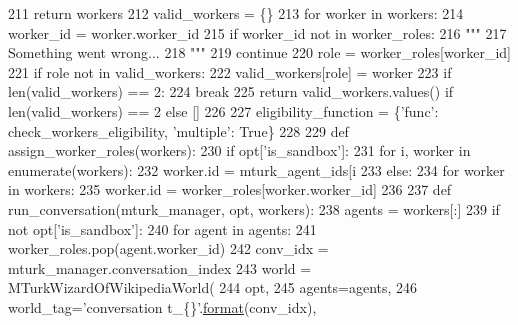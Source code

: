 \begin{DoxyCode}
211                 \textcolor{keywordflow}{return} workers
212             valid\_workers = \{\}
213             \textcolor{keywordflow}{for} worker \textcolor{keywordflow}{in} workers:
214                 worker\_id = worker.worker\_id
215                 \textcolor{keywordflow}{if} worker\_id \textcolor{keywordflow}{not} \textcolor{keywordflow}{in} worker\_roles:
216                     \textcolor{stringliteral}{"""}
217 \textcolor{stringliteral}{                    Something went wrong...}
218 \textcolor{stringliteral}{                    """}
219                     \textcolor{keywordflow}{continue}
220                 role = worker\_roles[worker\_id]
221                 \textcolor{keywordflow}{if} role \textcolor{keywordflow}{not} \textcolor{keywordflow}{in} valid\_workers:
222                     valid\_workers[role] = worker
223                 \textcolor{keywordflow}{if} len(valid\_workers) == 2:
224                     \textcolor{keywordflow}{break}
225             \textcolor{keywordflow}{return} valid\_workers.values() \textcolor{keywordflow}{if} len(valid\_workers) == 2 \textcolor{keywordflow}{else} []
226 
227         eligibility\_function = \{\textcolor{stringliteral}{'func'}: check\_workers\_eligibility, \textcolor{stringliteral}{'multiple'}: \textcolor{keyword}{True}\}
228 
229         \textcolor{keyword}{def }assign\_worker\_roles(workers):
230             \textcolor{keywordflow}{if} opt[\textcolor{stringliteral}{'is\_sandbox'}]:
231                 \textcolor{keywordflow}{for} i, worker \textcolor{keywordflow}{in} enumerate(workers):
232                     worker.id = mturk\_agent\_ids[i %
233             \textcolor{keywordflow}{else}:
234                 \textcolor{keywordflow}{for} worker \textcolor{keywordflow}{in} workers:
235                     worker.id = worker\_roles[worker.worker\_id]
236 
237         \textcolor{keyword}{def }run\_conversation(mturk\_manager, opt, workers):
238             agents = workers[:]
239             \textcolor{keywordflow}{if} \textcolor{keywordflow}{not} opt[\textcolor{stringliteral}{'is\_sandbox'}]:
240                 \textcolor{keywordflow}{for} agent \textcolor{keywordflow}{in} agents:
241                     worker\_roles.pop(agent.worker\_id)
242             conv\_idx = mturk\_manager.conversation\_index
243             world = MTurkWizardOfWikipediaWorld(
244                 opt,
245                 agents=agents,
246                 world\_tag=\textcolor{stringliteral}{'conversation t\_\{\}'}.\hyperlink{namespaceparlai_1_1chat__service_1_1services_1_1messenger_1_1shared__utils_a32e2e2022b824fbaf80c747160b52a76}{format}(conv\_idx),

\end{DoxyCode}

